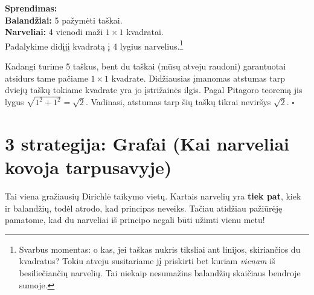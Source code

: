 \documentclass[11pt,a4paper]{scrartcl}
\newenvironment{solution}
    {\begin{list}{}{\setlength{\leftmargin}{10pt}\setlength{\rightmargin}{10pt}}\item[]}
    {\end{list}}
\begin{document}
\begin{solution}
\textbf{Sprendimas:} \\
\textbf{Balandžiai:} 5 pažymėti taškai.\\
\textbf{Narveliai:} 4 vienodi maži $1 \times 1$ kvadratai.\\

Padalykime didįjį kvadratą į 4 lygius narvelius.\footnote{Svarbus momentas: o kas, jei taškas nukris tiksliai ant linijos, skiriančios du kvadratus? Tokiu atveju susitariame jį priskirti bet kuriam \textit{vienam} iš besiliečiančių narvelių. Tai niekaip nesumažins balandžių skaičiaus bendroje sumoje.}
\begin{center}
\end{center}

Kadangi turime 5 taškus, bent du taškai (mūsų atveju raudoni) garantuotai atsidurs tame pačiame $1 \times 1$ kvadrate. Didžiausias įmanomas atstumas tarp dviejų taškų tokiame kvadrate yra jo įstrižainės ilgis. Pagal Pitagoro teoremą jis lygus $\sqrt{1^2 + 1^2} = \sqrt{2}$. Vadinasi, atstumas tarp šių taškų tikrai neviršys $\sqrt{2}$. \hfill $\square$
\end{solution}

\section{3 strategija: Grafai (Kai narveliai kovoja tarpusavyje)}

Tai viena gražiausių Dirichlė taikymo vietų. Kartais narvelių yra \textbf{tiek pat}, kiek ir balandžių, todėl atrodo, kad principas neveiks. Tačiau atidžiau pažiūrėję pamatome, kad du narveliai iš principo negali būti užimti vienu metu!
\end{document}
